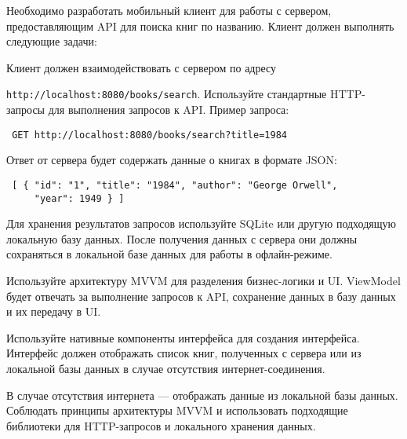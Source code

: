 
Необходимо разработать мобильный клиент для работы с сервером, предоставляющим API для поиска книг по названию. Клиент должен выполнять следующие задачи:


Клиент должен взаимодействовать с сервером по адресу 

\texttt{http://localhost:8080/books/search}. Используйте стандартные HTTP-запросы для выполнения запросов к API. Пример запроса:

\begin{verbatim} GET http://localhost:8080/books/search?title=1984 \end{verbatim}

Ответ от сервера будет содержать данные о книгах в формате JSON:

\begin{verbatim} [ { "id": "1", "title": "1984", "author": "George Orwell",
     "year": 1949 } ] \end{verbatim}


Для хранения результатов запросов используйте SQLite или другую подходящую локальную базу данных. После получения данных с сервера они должны сохраняться в локальной базе данных для работы в офлайн-режиме.


Используйте архитектуру MVVM для разделения бизнес-логики и UI. ViewModel будет отвечать за выполнение запросов к API, сохранение данных в базу данных и их передачу в UI.


Используйте нативные компоненты интерфейса для создания интерфейса. Интерфейс должен отображать список книг, полученных с сервера или из локальной базы данных в случае отсутствия интернет-соединения.


В случае отсутствия интернета — отображать данные из локальной базы данных.
Соблюдать принципы архитектуры MVVM и использовать подходящие библиотеки для HTTP-запросов и локального хранения данных.
